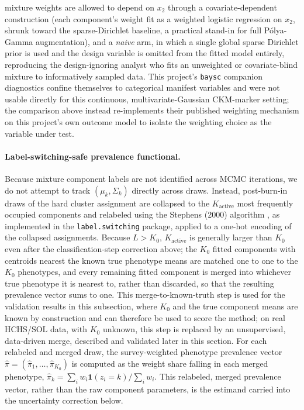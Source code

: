 \documentclass[11pt]{article}
\begin{document}
mixture weights are allowed to depend on $x_2$ through a covariate-dependent construction (each component's weight fit as a weighted logistic regression on $x_2$, shrunk toward the sparse-Dirichlet baseline, a practical stand-in for full P\'olya-Gamma augmentation), and a \emph{naive} arm, in which a single global sparse Dirichlet prior is used and the design variable is omitted from the fitted model entirely, reproducing the design-ignoring analyst who fits an unweighted or covariate-blind mixture to informatively sampled data. This project's \texttt{baysc} companion diagnostics \citep{wu2026baysc} confine themselves to categorical manifest variables and were not usable directly for this continuous, multivariate-Gaussian CKM-marker setting; the comparison above instead re-implements their published weighting mechanism on this project's own outcome model to isolate the weighting choice as the variable under test.

\paragraph{Label-switching-safe prevalence functional.} Because mixture component labels are not identified across MCMC iterations, we do not attempt to track $(\mu_k, \Sigma_k)$ directly across draws. Instead, post-burn-in draws of the hard cluster assignment are collapsed to the $K_{\text{active}}$ most frequently occupied components and relabeled using the Stephens (2000) algorithm \citep{stephens2000dealing}, as implemented in the \texttt{label.switching} package, applied to a one-hot encoding of the collapsed assignments. Because $L > K_0$, $K_{\text{active}}$ is generally larger than $K_0$ even after the classification-step correction above; the $K_0$ fitted components with centroids nearest the known true phenotype means are matched one to one to the $K_0$ phenotypes, and every remaining fitted component is merged into whichever true phenotype it is nearest to, rather than discarded, so that the resulting prevalence vector sums to one. This merge-to-known-truth step is used for the validation results in this subsection, where $K_0$ and the true component means are known by construction and can therefore be used to score the method; on real HCHS/SOL data, with $K_0$ unknown, this step is replaced by an unsupervised, data-driven merge, described and validated later in this section. For each relabeled and merged draw, the survey-weighted phenotype prevalence vector $\hat\pi = (\hat\pi_1, \dots, \hat\pi_{K_0})$ is computed as the weight share falling in each merged phenotype, $\hat\pi_k = \sum_i w_i \mathbf{1}(z_i = k) / \sum_i w_i$. This relabeled, merged prevalence vector, rather than the raw component parameters, is the estimand carried into the uncertainty correction below.
\end{document}
